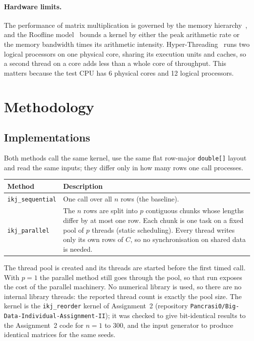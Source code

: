 \documentclass[11pt,a4paper]{article}
\newcommand{\code}[1]{\texttt{#1}}
\begin{document}
\paragraph{Hardware limits.} The performance of matrix multiplication is governed by the memory hierarchy~\cite{goto}, and the Roofline model~\cite{roofline} bounds a kernel by either the peak arithmetic rate or the memory bandwidth times its arithmetic intensity. Hyper-Threading~\cite{marr} runs two logical processors on one physical core, sharing its execution units and caches, so a second thread on a core adds less than a whole core of throughput. This matters because the test CPU has 6 physical cores and 12 logical processors.

\section{Methodology}

\subsection{Implementations}

Both methods call the same kernel, use the same flat row-major \code{double[]} layout and read the same inputs; they differ only in how many rows one call processes.

\begin{table}[H]
\centering\small
\begin{tabularx}{\linewidth}{@{}lX@{}}
\toprule
Method & Description \\
\midrule
\code{ikj\_sequential} & One call over all $n$ rows (the baseline). \\
\code{ikj\_parallel} & The $n$ rows are split into $p$ contiguous chunks whose lengths differ by at most one row. Each chunk is one task on a fixed pool of $p$ threads (static scheduling). Every thread writes only its own rows of $C$, so no synchronisation on shared data is needed. \\
\bottomrule
\end{tabularx}
\end{table}

The thread pool is created and its threads are started before the first timed call. With $p = 1$ the parallel method still goes through the pool, so that run exposes the cost of the parallel machinery. No numerical library is used, so there are no internal library threads: the reported thread count is exactly the pool size. The kernel is the \code{ikj\_reorder} kernel of Assignment~2 (repository \code{Pancrasi0/Big-Data-Individual-Assignment-II}); it was checked to give bit-identical results to the Assignment~2 code for $n = 1$ to $300$, and the input generator to produce identical matrices for the same seeds.
\end{document}

